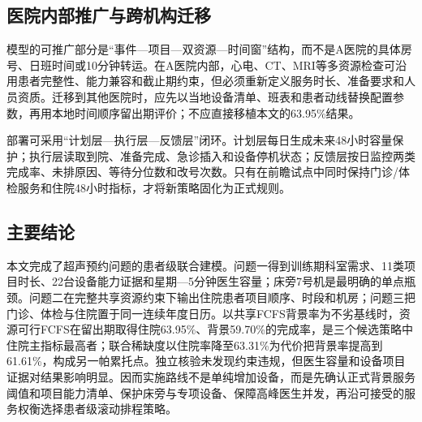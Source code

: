 \subsection{医院内部推广与跨机构迁移}

模型的可推广部分是“事件—项目—双资源—时间窗”结构，而不是A医院的具体房号、日班时间或10分钟转运。在A医院内部，心电、CT、MRI等多资源检查可沿用患者完整性、能力兼容和截止期约束，但必须重新定义服务时长、准备要求和人员资质。迁移到其他医院时，应先以当地设备清单、班表和患者动线替换配置参数，再用本地时间顺序留出期评价；不应直接移植本文的63.95\%结果。

部署可采用“计划层—执行层—反馈层”闭环。计划层每日生成未来48小时容量保护；执行层读取到院、准备完成、急诊插入和设备停机状态；反馈层按日监控两类完成率、未排原因、等待分位数和改号次数。只有在前瞻试点中同时保持门诊/体检服务和住院48小时指标，才将新策略固化为正式规则。

\subsection{主要结论}

本文完成了超声预约问题的患者级联合建模。问题一得到训练期科室需求、11类项目时长、22台设备能力证据和星期—5分钟医生容量；床旁7号机是最明确的单点瓶颈。问题二在完整共享资源约束下输出住院患者项目顺序、时段和机房；问题三把门诊、体检与住院置于同一连续年度日历。以共享FCFS背景率为不劣基线时，资源可行FCFS在留出期取得住院63.95\%、背景59.70\%的完成率，是三个候选策略中住院主指标最高者；联合稀缺度以住院率降至63.31\%为代价把背景率提高到61.61\%，构成另一帕累托点。独立核验未发现约束违规，但医生容量和设备项目证据对结果影响明显。因而实施路线不是单纯增加设备，而是先确认正式背景服务阈值和项目能力清单、保护床旁与专项设备、保障高峰医生并发，再沿可接受的服务权衡选择患者级滚动排程策略。
